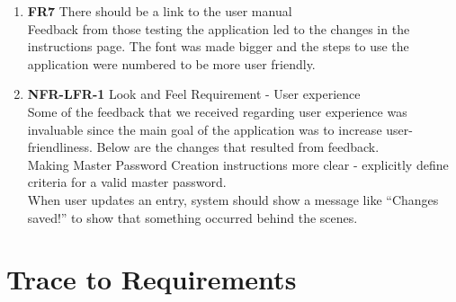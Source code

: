 \documentclass[12pt, titlepage]{article}
\begin{document}
	\begin{enumerate}[resume]

		\item \textbf{FR7} There should be a link to the user manual\\
		Feedback from those testing the application led to the changes in the instructions page. The font was made bigger and the steps to use the application were numbered to be more user friendly.
	
		\item \textbf{NFR-LFR-1} Look and Feel Requirement - User experience\\
		Some of the feedback that we received regarding user experience was invaluable since the main goal of the application was to increase user-friendliness. Below are the changes that resulted from feedback.\\
		Making Master Password Creation instructions more clear - explicitly define criteria for a valid master password.\\
		When user updates an entry, system should show a message like “Changes saved!” to show that something occurred behind the scenes.

	\end{enumerate}


\section{Trace to Requirements}
\end{document}
